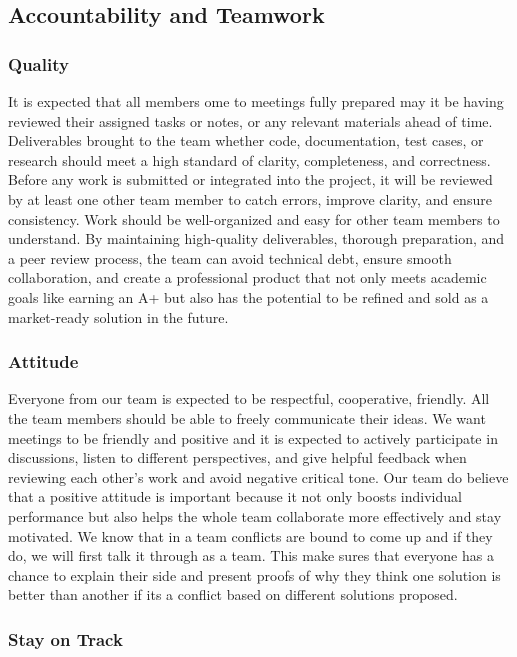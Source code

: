 \documentclass{article}
\begin{document}
\subsection*{Accountability and Teamwork}

\subsubsection*{Quality} 

It is expected that all members ome to meetings fully prepared may it be having reviewed their assigned tasks or notes, 
or any relevant materials ahead of time. Deliverables brought to the team whether code, documentation, test cases, 
or research should meet a high standard of clarity, completeness, and correctness. Before any work is submitted or 
integrated into the project, it will be reviewed by at least one other team member to catch errors, improve clarity, 
and ensure consistency. Work should be well-organized and easy for other team members to understand. By maintaining 
high-quality deliverables, thorough preparation, and a peer review process, the team can avoid technical debt, ensure 
smooth collaboration, and create a professional product that not only meets academic goals like earning an A+ but also 
has the potential to be refined and sold as a market-ready solution in the future.

\subsubsection*{Attitude}

Everyone from our team is expected to be respectful, cooperative, friendly. All the team members should be able to freely communicate their ideas. 
We want meetings to be friendly and positive and it is expected to actively participate in discussions, listen to different perspectives, and give 
helpful feedback when reviewing each other’s work and avoid negative critical tone. Our team do believe that a positive attitude is important because it not only 
boosts individual performance but also helps the whole team collaborate more effectively and stay motivated. 
We know that in a team conflicts are bound to come up and if they do, we will first talk it through as a team. This make sures that everyone has a chance 
to explain their side and present proofs of why they think one solution is better than another if its a conflict based on different solutions proposed.

\subsubsection*{Stay on Track}
\end{document}
